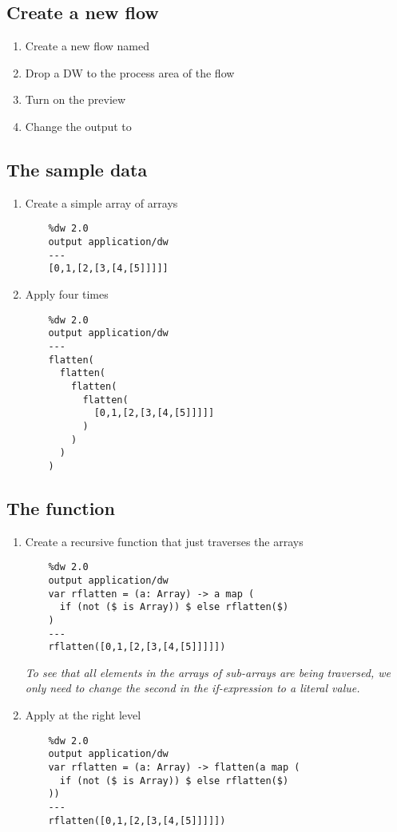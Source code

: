 \subsection{Create a new flow}
\begin{enumerate}
\item Create a new flow named 
\item Drop a DW to the process area of the flow
\item Turn on the preview
\item Change the output to 
\end{enumerate}

\subsection{The sample data}
\begin{enumerate}[resume*]
\item Create a simple array of arrays
  \begin{verbatim}
    %dw 2.0
    output application/dw
    ---
    [0,1,[2,[3,[4,[5]]]]]
  \end{verbatim}
\item Apply  four times
  \begin{verbatim}
    %dw 2.0
    output application/dw
    ---
    flatten(
      flatten(
        flatten(
          flatten(
            [0,1,[2,[3,[4,[5]]]]]
          )
        )
      )
    )
  \end{verbatim}
\end{enumerate}

\subsection{The  function}
\begin{enumerate}[resume*]
\item Create a recursive function that just traverses the arrays
  \begin{verbatim}
    %dw 2.0
    output application/dw
    var rflatten = (a: Array) -> a map (
      if (not ($ is Array)) $ else rflatten($)
    )
    ---
    rflatten([0,1,[2,[3,[4,[5]]]]])
  \end{verbatim}
  \emph{
    To see that all elements in the arrays of sub-arrays are being traversed, we only need to change the second \ttt{\$} in the if-expression to a literal value.
  }
\item Apply  at the right level
  \begin{verbatim}
    %dw 2.0
    output application/dw
    var rflatten = (a: Array) -> flatten(a map (
      if (not ($ is Array)) $ else rflatten($)
    ))
    ---
    rflatten([0,1,[2,[3,[4,[5]]]]])
  \end{verbatim}
\end{enumerate}

